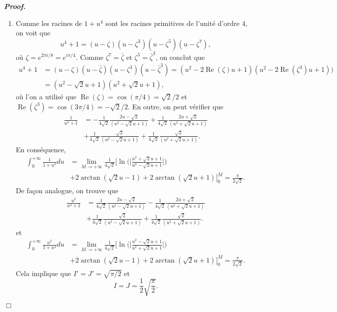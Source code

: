 \documentclass[11pt,a4paper]{article}
\newenvironment{preuve}[1][]
{\vskip 2mm  \noindent\emph{\bf Proof#1. }}{$\Box$ \vskip 2mm}
\begin{document}
\begin{preuve}
\begin{enumerate}
				\item
				Comme les racines de $1 + u^{4}$ sont les racines primitives de l'unité d'ordre $4$, on voit que 
				\[     u^{4} + 1 = (u - \zeta) (u - \zeta^{3}) (u - \zeta^{5}) (u - \zeta^{7}),     \]
				où $\zeta = e^{2 \pi i / 8} = e^{i \pi/4}$. 
				Comme $\zeta^{7} = \bar{\zeta}$ et $\zeta^{5} = \bar{\zeta}^{3}$, on conclut que 
				\begin{align*} 
				u^{4} + 1 &= (u - \zeta) (u - \bar{\zeta}) (u - \zeta^{3}) (u - \bar{\zeta}^{3}) = (u^{2} - 2 \operatorname{Re}(\zeta) u + 1) (u^{2} - 2 \operatorname{Re}(\zeta^{3}) u + 1)) 
				\\
				&= (u^{2} - \sqrt{2} u + 1) (u^{2} + \sqrt{2} u + 1),      
				\end{align*}
				où l'on a utilisé que $\operatorname{Re}(\zeta) = \cos(\pi/4) = \sqrt{2}/2$ et $\operatorname{Re}(\zeta^{3}) = \cos(3\pi/4) = -\sqrt{2}/2$. 
				En outre, on peut vérifier que 
				\begin{align*}
				\frac{1}{u^{4}+1} &= - \frac{1}{4 \sqrt{2}} \frac{2u - \sqrt{2}}{(u^{2}-\sqrt{2}u+1)} + \frac{1}{4 \sqrt{2}} \frac{2u + \sqrt{2}}{(u^{2}+\sqrt{2}u+1)} 
				\\
				&+ \frac{1}{4 \sqrt{2}} \frac{\sqrt{2}}{(u^{2}-\sqrt{2}u+1)} + \frac{1}{4 \sqrt{2}} \frac{\sqrt{2}}{(u^{2}+\sqrt{2}u+1)}.     
				\end{align*}
				En conséquence, 
				\begin{align*}    
				\int_0^{+\infty} \frac{1}{1+u^4} du &= \underset{M \rightarrow + \infty}{\lim} \frac{1}{4 \sqrt{2}}\bigg[ \ln\bigg(\bigg|\frac{u^{2}+\sqrt{2}u+1}{u^{2}-\sqrt{2}u+1}\bigg|\bigg) 
				\\
				&+ 2 \arctan(\sqrt{2} u - 1) + 2 \arctan(\sqrt{2} u + 1)\bigg]_{0}^{M} = \frac{\pi}{2 \sqrt{2}}.     
				\end{align*}
				De façon analogue, on trouve que 
				\begin{align*}
				\frac{u^{2}}{u^{4}+1} &= \frac{1}{4 \sqrt{2}} \frac{2u - \sqrt{2}}{(u^{2}-\sqrt{2}u+1)} - \frac{1}{4 \sqrt{2}} \frac{2u + \sqrt{2}}{(u^{2}+\sqrt{2}u+1)} 
				\\
				&+ \frac{1}{4 \sqrt{2}} \frac{\sqrt{2}}{(u^{2}-\sqrt{2}u+1)} + \frac{1}{4 \sqrt{2}} \frac{\sqrt{2}}{(u^{2}+\sqrt{2}u+1)}.     
				\end{align*}
				et
				\begin{align*}
				\int_0^{+\infty} \frac{u^{2}}{1+u^4} du &= \underset{M \rightarrow + \infty}{\lim} \frac{1}{4 \sqrt{2}}\bigg[ \ln\bigg(\bigg|\frac{u^{2}-\sqrt{2}u+1}{u^{2}+\sqrt{2}u+1}\bigg|\bigg) 
				\\
				&+ 2 \arctan(\sqrt{2} u - 1) + 2 \arctan(\sqrt{2} u + 1)\bigg]_{0}^{M} = \frac{\pi}{2 \sqrt{2}}.     
				\end{align*}
				Cela implique que $I' = J' = \sqrt{\pi/2}$ et 
				\[     I=J=\frac{1}{2} \sqrt{\frac{\pi}{2}}.     \]
			\end{enumerate}
		\end{preuve}
		
\end{document}
